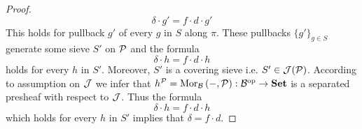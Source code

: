 \begin{proof}
$$\delta\cdot g' = f\cdot d\cdot g'$$
This holds for pullback $g'$ of every $g$ in $S$ along $\pi$. These pullbacks $\{g'\}_{g\in S}$ generate some sieve $S'$ on ${\mathcal P}$ and the formula
$$\delta\cdot h = f\cdot d\cdot h$$
holds for every $h$ in $S'$. Moreover, $S'$ is a covering sieve i.e. $S'\in {\mathcal J}({\mathcal P})$. According to assumption on ${\mathcal J}$ we infer that $h^{{\mathcal P}} = \mathrm{Mor}_{{\mathcal B}}\left(-,{\mathcal P}\right):{\mathcal B}^{\mathrm{op}}\rightarrow \mathbf{Set}$ is a separated presheaf with respect to ${\mathcal J}$. Thus the formula
$$\delta\cdot h = f\cdot d\cdot h$$
which holds for every $h$ in $S'$ implies that $\delta = f\cdot d$.
\end{proof}


































